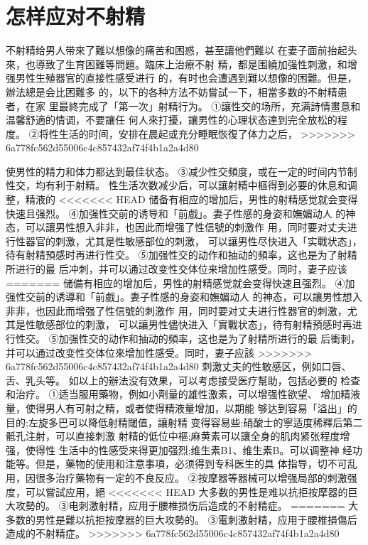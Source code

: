\documentclass[12pt,UTF8]{ctexbook}
\begin{document}
\section{怎样应对不射精}
不射精给男人带來了難以想像的痛苦和困惑，甚至讓他們難以
在妻子面前抬起头來，也導致了生育困難等問題。臨床上治療不射
精，都是围繞加强性刺激，和增强男性生殖器官的直接性感受进行
的，有时也会遭遇到難以想像的困難。但是，辦法總是会比困難多
的，以下的各种方法不妨嘗試一下，相當多数的不射精患者，在家
里最終完成了「第一次」射精行为。
①讓性交的场所，充满詩情畫意和温馨舒適的情调，不要讓任
何人來打擾，讓男性的心理状态達到完全放松的程度。
②将性生活的时间，安排在晨起或充分睡眠恢復了体力之后，
>>>>>>> 6a778fc562d55006c4c857432af74f4b1a2a4d80

使男性的精力和体力都达到最佳状态。
③减少性交頻度，或在一定的时间内节制性交，均有利于射精。
性生活次数减少后，可以讓射精中樞得到必要的休息和调整，精液的
<<<<<<< HEAD
储备有相应的增加后，男性的射精感觉就会变得快速且强烈。
④加强性交前的诱导和「前戲」。妻子性感的身姿和嫵媚动人
的神态，可以讓男性想入非非，也因此而增强了性信號的刺激作
用，同时要对丈夫进行性器官的刺激，尤其是性敏感部位的刺激，
可以讓男性尽快进入「实戰状态」，待有射精預感时再进行性交。
⑤加强性交的动作和抽动的頻率，这也是为了射精所进行的最
后冲刺，并可以通过改变性交体位来增加性感受。同时，妻子应该
=======
储備有相应的增加后，男性的射精感觉就会变得快速且强烈。
④加强性交前的诱導和「前戲」。妻子性感的身姿和嫵媚动人
的神态，可以讓男性想入非非，也因此而增强了性信號的刺激作
用，同时要对丈夫进行性器官的刺激，尤其是性敏感部位的刺激，
可以讓男性儘快进入「實戰状态」，待有射精預感时再进行性交。
⑤加强性交的动作和抽动的頻率，这也是为了射精所进行的最
后衝刺，并可以通过改变性交体位來增加性感受。同时，妻子应該
>>>>>>> 6a778fc562d55006c4c857432af74f4b1a2a4d80
刺激丈夫的性敏感区，例如口唇、舌、乳头等。
如以上的辦法没有效果，可以考虑接受医疗幫助，包括必要的
检查和治疗。
①适当服用藥物，例如小劑量的雄性激素，可以增强性欲望、
增加精液量，使得男人有可射之精，或者使得精液量增加，以期能
够达到容易「溢出」的目的;左旋多巴可以降低射精閾值，讓射精
变得容易些;硝酸士的寧适度稀釋后第二骶孔注射，可以直接刺激
射精的低位中樞;麻黄素可以讓全身的肌肉紧张程度增强，使得性
生活中的性感受来得更加强烈;维生素B1、维生素B。可以调整神
经功能等。但是，藥物的使用和注意事項，必须得到专科医生的具
体指导，切不可乱用，因很多治疗藥物有一定的不良反应。
②按摩器等器械可以增强局部的刺激强度，可以嘗試应用，絕
<<<<<<< HEAD
大多数的男性是难以抗拒按摩器的巨大攻勢的。
③电刺激射精，应用于腰椎损伤后造成的不射精症。
=======
大多数的男性是難以抗拒按摩器的巨大攻勢的。
③電刺激射精，应用于腰椎損傷后造成的不射精症。
>>>>>>> 6a778fc562d55006c4c857432af74f4b1a2a4d80
\end{document}
